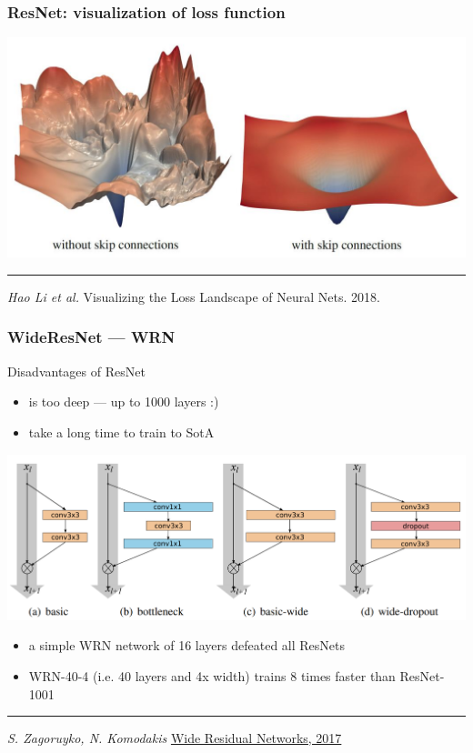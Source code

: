 \documentclass[fullscreen=true, bookmarks=true, hyperref={pdfencoding=unicode}]{beamer}
\begin{document}
\begin{frame}
  \frametitle{ResNet: visualization of loss function}

\begin{center}
  \includegraphics[keepaspectratio,
                   width=0.7\paperwidth]{skip-connection-opt.jpg}
\end{center}

  \noindent\rule{8cm}{0.4pt}

  {\it Hao Li et al.} Visualizing the Loss Landscape of Neural Nets. 2018.
\end{frame}


\begin{frame}
  \frametitle{WideResNet — WRN}
  Disadvantages of ResNet
  \begin{itemize}
    \item is too deep — up to 1000 layers :)
    \item take a long time to train to SotA
  \end{itemize}
  \begin{center}
    \includegraphics[keepaspectratio,
                     width=0.6\paperwidth]{wrn_blocks.png}
  \end{center}

  \begin{itemize}
    \item a simple WRN network of 16 layers defeated all ResNets
    \item WRN-40-4 (i.e. 40 layers and 4x width) trains 8 times faster than ResNet-1001
  \end{itemize}

  \noindent\rule{8cm}{0.4pt}

  {\it S. Zagoruyko, N. Komodakis} \href{https://arxiv.org/pdf/1605.07146.pdf}{Wide Residual Networks, 2017}
\end{frame}
\end{document}
